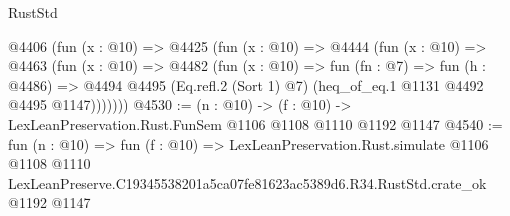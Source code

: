\begin{lexlean}{RustStd}
\begin{coremodule}
    @4406
      (fun (x : @10) =>
      @4425
        (fun (x : @10) =>
        @4444
          (fun (x : @10) =>
          @4463
            (fun (x : @10) =>
            @4482
              (fun (x : @10) =>
              fun (fn : @7) =>
              fun (h : @4486) =>
              @4494 @4495 (Eq.refl.{2} (Sort 1) @7) (heq_of_eq.{1} @1131 @4492 @4495 @1147)))))))
@4530 := (n : @10) -> (f : @10) -> LexLeanPreservation.Rust.FunSem @1106 @1108 @1110 @1192 @1147
@4540 := fun (n : @10) =>
  fun (f : @10) =>
  LexLeanPreservation.Rust.simulate
    @1106
    @1108
    @1110
    LexLeanPreserve.C19345538201a5ca07fe81623ac5389d6.R34.RustStd.crate_ok
    @1192
    @1147
\end{coremodule}
\end{lexlean}
